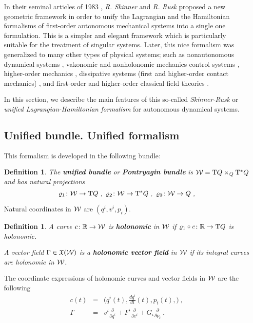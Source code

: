 \documentclass[12pt]{report}
\newtheorem{definition}[teor]{Definition}
\def\beann{\begin{eqnarray*}}
\def\eeann{\end{eqnarray*}}
\def\derpar#1#2{\frac{\partial{#1}}{\partial{#2}}}
\def\vf{\mathfrak X}
\def\Real{\mathbb{R}}
\def\Tan{{\rm T}}
\begin{document}
In their seminal articles of 1983 \cite{SR-83,SR-83b}, 
{\it R. Skinner} and {\it R. Rusk} proposed a new geometric framework 
in order to unify the Lagrangian and the Hamiltonian formalisms
of first-order autonomous mechanical systems
into a single one formulation.
This is a simpler and elegant framework
which is particularly suitable for the treatment of singular systems.
Later, this nice formalism was generalized to many other types of physical systems;
such as nonautonomous dynamical systems \cite{BEMMR-2008,CMC-2002,GM-05},
vakonomic and nonholonomic mechanics \cite{CLMM-2002}
control systems \cite{BEMMR-2007,CMZ-10}, 
higher-order mechanics \cite{art:Prieto_Roman11,
art:Prieto_Roman12},  
dissipative systems (first and higher-order contact mechanics)  \cite{LGLMR-2021,LGMMR-2020},
and first-order and higher-order classical field theories
\cite{CLMV-09,CV-2007,LMM-2003,
ELMMR-04,PR-2015,RRS-2005,RRSV-2011,Vitagliano10}.

In this section, we describe the main features of this so-called {\sl Skinner-Rusk} 
or {\sl unified Lagrangian-Hamiltonian formalism} for autonomous dynamical systems.


\subsection{Unified bundle. Unified formalism}


This formalism is developed in the following bundle:

\begin{definition}
The  \textbf{unified bundle} or  \textbf{Pontryagin bundle}
 is ${\cal W}=\Tan Q\times_Q\Tan^*Q$
and has natural projections
$$
 \varrho_1\colon{\cal W}\to\Tan Q \ ,\
 \varrho_2\colon{\cal W}\to\Tan^*Q \ ,\
\varrho_0\colon{\cal W}\to Q \ ,
$$
\end{definition}

Natural coordinates in ${\cal W}$ are $(q^i,v^i,p_i)$.

\begin{definition}
A curve $c\colon\Real\rightarrow{\cal W}$
is \textbf{holonomic} in ${\cal W}$ if
$\varrho_1\circ c\colon\Real\to\Tan Q$ is holonomic.

A vector field $\Gamma \in\vf({\cal W})$  is a \textbf{holonomic vector field} in ${\cal W}$
if its integral curves  are holonomic in ${\cal W}$. 
\end{definition}

The coordinate expressions of holonomic curves and vector fields in  ${\cal W}$ are the following
\beann
c(t)&=&\Big(q^i(t),\frac{dq^i}{d t}(t),p_i(t),\Big) \ , \\
\Gamma&=& v^i\derpar{}{q^i}+F^i\derpar{}{v^i}+G_i\derpar{}{p_i}  \ .
\eeann
\end{document}
